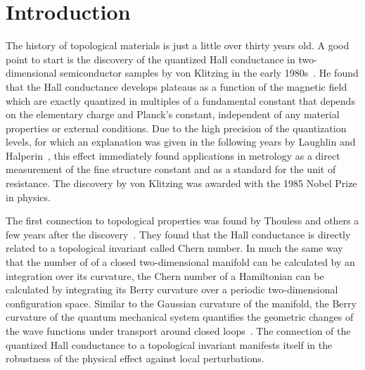 \chapter*{Introduction}


The history of topological materials is just a little over thirty years old.
A good point to start is the discovery of the quantized Hall conductance in two-dimensional semiconductor samples by von Klitzing in the early 1980s~\cite{Klitzing1980,Klitzing1992}.
He found that the Hall conductance develops plateaus as a function of the magnetic field which are exactly quantized in multiples of a fundamental constant that depends on the elementary charge and Planck's constant, independent of any material properties or external conditions.
Due to the high precision of the quantization levels, for which an explanation was given in the following years by Laughlin and Halperin~\cite{Laughlin1981,Halperin1982}, this effect immediately found applications in metrology as a direct measurement of the fine structure constant and as a standard for the unit of resistance.
The discovery by von Klitzing was awarded with the 1985 Nobel Prize in physics.

The first connection to topological properties was found by Thouless and others a few years after the discovery~\cite{Thouless1982,Niu1985,Kohmoto1985,Avron1985,Kohmoto1989,Bellissard1994,Avron2003}.
They found that the Hall conductance is directly related to a topological invariant called Chern number.
In much the same way that the number of  of a closed two-dimensional manifold can be calculated by an integration over its curvature, the Chern number of a Hamiltonian can be calculated by integrating its Berry curvature over a periodic two-dimensional configuration space.
Similar to the Gaussian curvature of the manifold, the Berry curvature of the quantum mechanical system quantifies the geometric changes of the wave functions under transport around closed loops~\cite{Berry1984,Zak1989}.
The connection of the quantized Hall conductance to a topological invariant manifests itself in the robustness of the physical effect against local perturbations.


